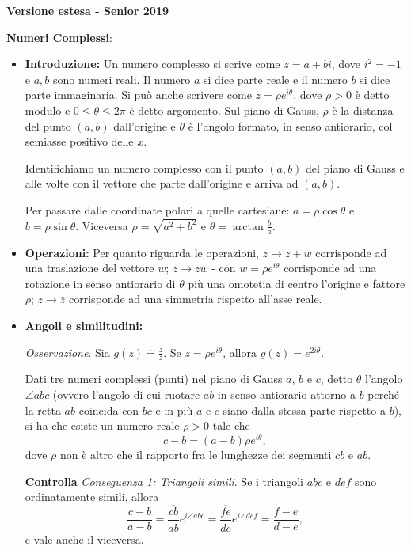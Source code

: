 \vspace{0.3cm}
\large{\textbf{Versione estesa - Senior 2019}}\normalsize

\vspace{0.3cm}
\textbf{Numeri Complessi}:
\begin{itemize}
\item \textbf{Introduzione:} Un numero complesso si scrive come $z=a+bi$, dove $i^2=-1$ e $a,b$ sono numeri reali. Il numero $a$ si dice parte reale e il numero $b$ si dice parte immaginaria. Si può anche scrivere come $z=\rho e^{i\theta}$, dove $\rho>0$ è detto modulo e $0\leq \theta\leq 2\pi$ è detto argomento. Sul piano di Gauss, $\rho$ è la distanza del punto $(a,b)$ dall'origine e $\theta$ è l'angolo formato, in senso antiorario, col semiasse positivo delle $x$.

Identifichiamo un numero complesso con il punto $(a,b)$ del piano di Gauss e alle volte con il vettore che parte dall'origine e arriva ad $(a,b)$.

Per passare dalle coordinate polari a quelle cartesiane: $a=\rho \cos\theta$ e $b=\rho\sin\theta$. Viceversa $\rho=\sqrt{a^2+b^2}$ e $\theta=\arctan{\frac{b}{a}}$. 

\item \textbf{Operazioni:} Per quanto riguarda le operazioni, $z\to z+w$ corrisponde ad una traslazione del vettore $w$; $z\to zw$ - con $w=\rho e^{i\theta}$ corrisponde ad una rotazione in senso antiorario di $\theta$ più una omotetia di centro l'origine e fattore $\rho$; $z\to \bar{z}$ corrisponde ad una simmetria rispetto all'asse reale. 

\item \textbf{Angoli e similitudini:}

\emph{Osservazione}. Sia $g(z)\doteq \frac{z}{\bar z}$. Se $z=\rho e^{i\theta}$, allora $g(z)=e^{2i\theta}$. 

Dati tre numeri complessi (punti) nel piano di Gauss $a$, $b$ e $c$, detto $\theta$ l'angolo $\angle abc$ (ovvero l'angolo di cui ruotare $ab$ in senso antiorario attorno a $b$ perché la retta $ab$ coincida con $bc$ e in più $a$ e $c$ siano dalla stessa parte rispetto a $b$), si ha che esiste un numero reale $\rho>0$ tale che 
$$
c-b=(a-b)\rho e^{i\theta},
$$
dove $\rho$ non è altro che il rapporto fra le lunghezze dei segmenti $\overline{cb}$ e $\overline{ab}$. 

\textbf{Controlla} \emph{Conseguenza 1: Triangoli simili}. Se i triangoli $abc$ e $def$ sono ordinatamente simili, allora 
$$
\frac{c-b}{a-b}=\frac{\overline{cb}}{\overline{ab}}e^{i\angle abc}=\frac{\overline{fe}}{\overline{de}}e^{i\angle def}=\frac{f-e}{d-e},
$$
e vale anche il viceversa.


\end{itemize}
